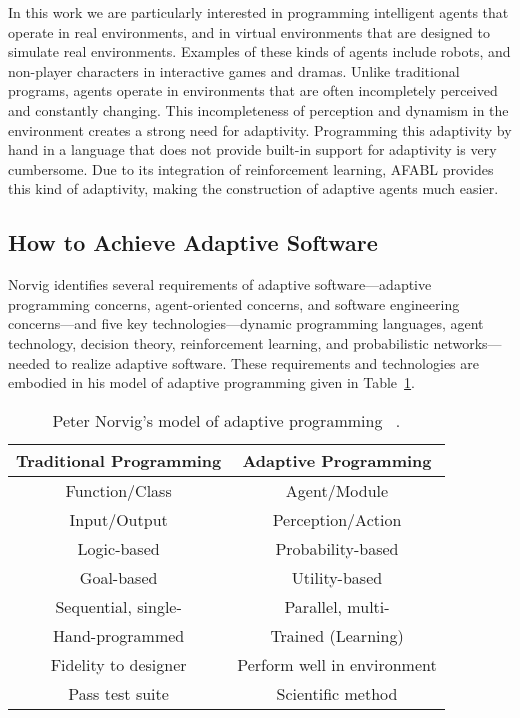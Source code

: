 In this work we are particularly interested in programming intelligent agents that operate in real environments, and in virtual environments that are designed to simulate real environments.  Examples of these kinds of agents include robots, and non-player characters in interactive games and dramas.  Unlike traditional programs, agents operate in environments that are often incompletely perceived and constantly changing.  This incompleteness of perception and dynamism in the environment creates a strong need for adaptivity.  Programming this adaptivity by hand in a language that does not provide built-in support for adaptivity is very cumbersome.  Due to its integration of reinforcement learning, AFABL provides this kind of adaptivity, making the construction of adaptive agents much easier.


\subsection{How to Achieve Adaptive Software}

Norvig identifies several requirements of adaptive soft\-ware---adaptive programming concerns, agent-oriented concerns, and software engineering concerns---and five key technologies---dynamic programming languages, agent technology, decision theory, reinforcement learning, and probabilistic networks---needed to realize adaptive software.  These requirements and technologies are embodied in his model of adaptive programming given in Table~\ref{tab:adaptive-model}.

\begin{table}[h]
\begin{tabular}{|c|c|}\hline
Traditional Programming & Adaptive Programming \\ \hline
Function/Class & Agent/Module \\
Input/Output & Perception/Action \\
Logic-based & Probability-based \\
Goal-based & Utility-based \\
Sequential, single- & Parallel, multi- \\
Hand-programmed & Trained (Learning) \\
Fidelity to designer & Perform well in environment \\
Pass test suite & Scientific method\\ \hline
\end{tabular}
\caption{Peter Norvig's model of adaptive programming
  ~\cite{norvig1998decision}.}
\label{tab:adaptive-model}
\end{table}

